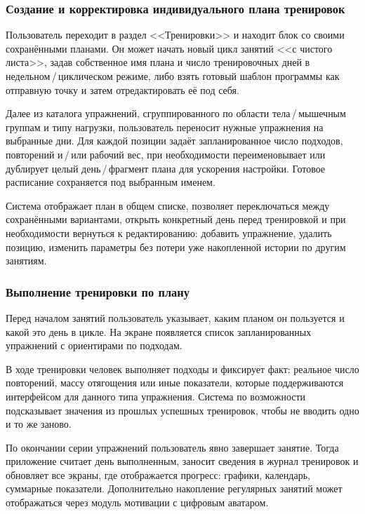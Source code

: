 \subsubsection{Создание и корректировка индивидуального плана тренировок}

Пользователь переходит в раздел <<Тренировки>> и находит блок со своими сохранёнными планами. Он может начать новый цикл занятий <<с чистого листа>>, задав собственное имя плана и число тренировочных дней в недельном\,/\,циклическом режиме, либо взять готовый шаблон программы как отправную точку и затем отредактировать её под себя.

Далее из каталога упражнений, сгруппированного по области тела\,/\,мышечным группам и типу нагрузки, пользователь переносит нужные упражнения на выбранные дни. Для каждой позиции задаёт запланированное число подходов, повторений и\,/\,или рабочий вес, при необходимости переименовывает или дублирует целый день\,/\,фрагмент плана для ускорения настройки. Готовое расписание сохраняется под выбранным именем.

Система отображает план в общем списке, позволяет переключаться между сохранёнными вариантами, открыть конкретный день перед тренировкой и при необходимости вернуться к редактированию: добавить упражнение, удалить позицию, изменить параметры без потери уже накопленной истории по другим занятиям.

\subsubsection{Выполнение тренировки по плану}

Перед началом занятий пользователь указывает, каким планом он пользуется и какой это день в цикле. На экране появляется список запланированных упражнений с ориентирами по подходам.

В ходе тренировки человек выполняет подходы и фиксирует факт: реальное число повторений, массу отягощения или иные показатели, которые поддерживаются интерфейсом для данного типа упражнения. Система по возможности подсказывает значения из прошлых успешных тренировок, чтобы не вводить одно и то же заново.

По окончании серии упражнений пользователь явно завершает занятие. Тогда приложение считает день выполненным, заносит сведения в журнал тренировок и обновляет все экраны, где отображается прогресс: графики, календарь, суммарные показатели. Дополнительно накопление регулярных занятий может отображаться через модуль мотивации с цифровым аватаром.

